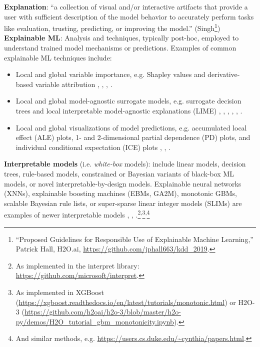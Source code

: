 \documentclass[sigconf]{acmart}
\begin{document}
\vspace{-8pt}
\noindent\textbf{Explanation}: ``a collection of visual and/or interactive artifacts that provide a user with sufficient description of the model behavior to accurately perform tasks like evaluation, trusting, predicting, or improving the model.'' (Singh\footnote{``Proposed Guidelines for Responsible Use of Explainable Machine Learning,'' Patrick Hall, H2O.ai, \url{https://github.com/jphall663/kdd_2019}.})\\

\vspace{-8pt}
\noindent\textbf{Explainable ML}:  Analysis and techniques, typically post-hoc, employed to understand trained model mechanisms or predictions. Examples of common explainable ML techniques include:
\begin{itemize}
\item Local and global variable importance, e.g. Shapley values and derivative-based variable attribution \cite{grad_attr} \cite{keinan2004fair}, \cite{shapley}, \cite{shapley1988shapley}, \cite{kononenko2010efficient}.
\item Local and global model-agnostic surrogate models, e.g. surrogate decision trees and local interpretable model-agnostic explanations (LIME) \cite{dt_surrogate2}, \cite{viper}, \cite{dt_surrogate1}, \cite{lime-sup}, \cite{lime}, \cite{wf_xnn}. 
\item Local and global visualizations of model predictions, e.g. accumulated local effect (ALE) plots, 1- and 2-dimensional partial dependence (PD) plots, and individual conditional expectation (ICE) plots \cite{ale_plot}, \cite{esl}, \cite{ice_plots}.
\end{itemize}  

\noindent\textbf{Interpretable models} (i.e. \textit{white-box} models): include linear models, decision trees, rule-based models, constrained or Bayesian variants of black-box ML models, or novel interpretable-by-design models. Explainable neural networks (XNNs), explainable boosting machines (EBMs, GA2M), monotonic GBMs, scalable Bayesian rule lists, or super-sparse linear integer models (SLIMs) are examples of newer interpretable models \cite{slim}, \cite{wf_xnn}, \cite{sbrl}.\footnote{As implemented in the interpret library: \url{https://github.com/microsoft/interpret}.}\textsuperscript{,}\footnote{As implemented in XGBoost (\url{https://xgboost.readthedocs.io/en/latest/tutorials/monotonic.html}) or H2O-3 (\url{https://github.com/h2oai/h2o-3/blob/master/h2o-py/demos/H2O_tutorial_gbm_monotonicity.ipynb}).}\textsuperscript{,}\footnote{And similar methods, e.g. \url{https://users.cs.duke.edu/~cynthia/papers.html}.}\\
\end{document}

